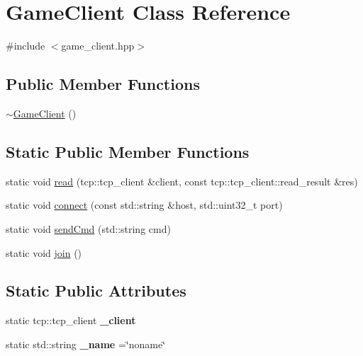 \hypertarget{classGameClient}{}\section{Game\+Client Class Reference}
\label{classGameClient}


{\ttfamily \#include $<$game\+\_\+client.\+hpp$>$}

\subsection*{Public Member Functions}
\begin{DoxyCompactItemize}
\item 
\hyperlink{classGameClient_abca673a8fcdb7d2ae8c0da02f91e4e64}{$\sim$\+Game\+Client} ()
\end{DoxyCompactItemize}
\subsection*{Static Public Member Functions}
\begin{DoxyCompactItemize}
\item 
static void \hyperlink{classGameClient_a73c9685b821c1480f48e23e63823ad1d}{read} (tcp\+::tcp\+\_\+client \&client, const tcp\+::tcp\+\_\+client\+::read\+\_\+result \&res)
\item 
static void \hyperlink{classGameClient_a2f8c1f7f62a01fd9a6624236285b02d6}{connect} (const std\+::string \&host, std\+::uint32\+\_\+t port)
\item 
static void \hyperlink{classGameClient_a52e2b91ca95b287a30e3c47b82a97547}{send\+Cmd} (std\+::string cmd)
\item 
static void \hyperlink{classGameClient_ad3eda37920dab8f5fcded42f3e08ce25}{join} ()
\end{DoxyCompactItemize}
\subsection*{Static Public Attributes}
\begin{DoxyCompactItemize}
\item 
static tcp\+::tcp\+\_\+client {\bfseries \+\_\+client}\hypertarget{classGameClient_a0ae16fa49b4937e75ec20eb85130d35d}{}\label{classGameClient_a0ae16fa49b4937e75ec20eb85130d35d}

\item 
static std\+::string {\bfseries \+\_\+name} =\char`\"{}noname\char`\"{}\hypertarget{classGameClient_a4fc5adb552542ebc455a25a26926025d}{}\label{classGameClient_a4fc5adb552542ebc455a25a26926025d}

\end{DoxyCompactItemize}


